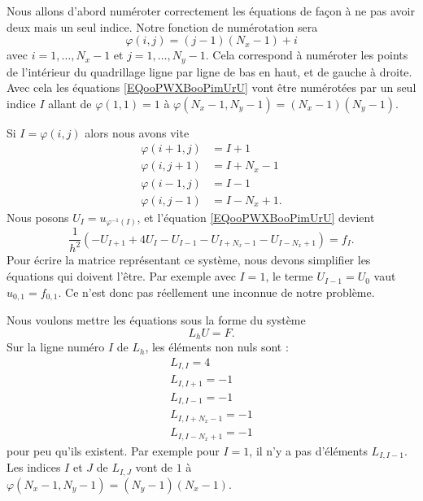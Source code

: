 Nous allons d'abord numéroter correctement les équations de façon à ne pas avoir deux mais un seul indice. Notre fonction de numérotation sera
\begin{equation}
	\varphi(i,j)=(j-1)(N_x-1)+i
\end{equation}
avec \( i=1,\ldots, N_x-1\) et \( j=1,\ldots, N_y-1\). Cela correspond à numéroter les points de l'intérieur du quadrillage ligne par ligne de bas en haut, et de gauche à droite. Avec cela les équations \eqref{EQooPWXBooPimUrU} vont être numérotées par un seul indice \( I\) allant de \( \varphi(1,1)=1\) à \( \varphi(N_x-1,N_y-1)=(N_x-1)(N_y-1)\).

Si \( I=\varphi(i,j)\) alors nous avons vite
\begin{subequations}
	\begin{align}
		\varphi(i+1,j) & =I+1      \\
		\varphi(i,j+1) & =I+N_x-1  \\
		\varphi(i-1,j) & =I-1      \\
		\varphi(i,j-1) & =I-N_x+1.
	\end{align}
\end{subequations}
Nous posons \( U_I=u_{\varphi^{-1}(I)}\), et l'équation \eqref{EQooPWXBooPimUrU} devient
\begin{equation}
	\frac{1}{ h^2 }(-U_{I+1}+4U_I-U_{I-1}-U_{I+N_x-1}-U_{I-N_x+1})=f_I.
\end{equation}
Pour écrire la matrice représentant ce système, nous devons simplifier les équations qui doivent l'être. Par exemple avec \( I=1\), le terme \( U_{I-1}=U_0\) vaut \( u_{0,1}=f_{0,1}\). Ce n'est donc pas réellement une inconnue de notre problème.

Nous voulons mettre les équations sous la forme du système
\begin{equation}
	L_hU=F.
\end{equation}
Sur la ligne numéro \( I\) de \( L_h\), les éléments non nuls sont :
\begin{subequations}        \label{SUBEQQooSRQNooYrCNhj}
	\begin{align}
		L_{I,I}=4        \\
		L_{I,I+1}=-1     \\
		L_{I,I-1}=-1     \\
		L_{I,I+N_x-1}=-1 \\
		L_{I,I-N_x+1}=-1
	\end{align}
\end{subequations}
pour peu qu'ils existent. Par exemple pour \( I=1\), il n'y a pas d'éléments \( L_{I,I-1}\). Les indices \( I\) et \( J\) de \( L_{I,J}\) vont de \( 1\) à \( \varphi(N_x-1,N_y-1)=(N_y-1)(N_x-1)\).

